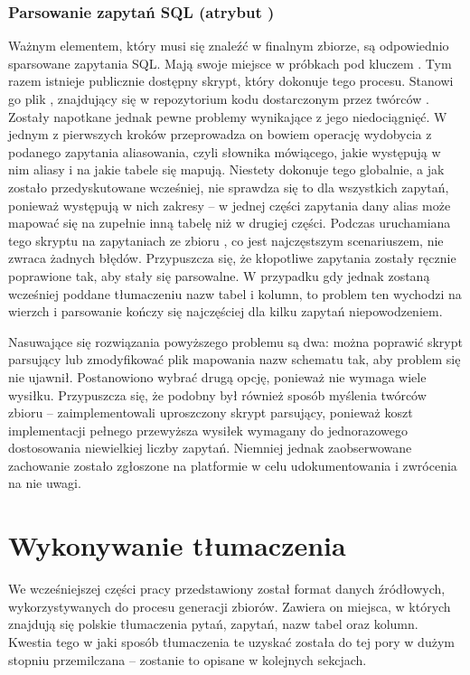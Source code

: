 \subsubsection{Parsowanie zapytań SQL (atrybut )}
Ważnym elementem, który musi się znaleźć w finalnym zbiorze, są odpowiednio sparsowane zapytania SQL. Mają swoje miejsce w próbkach pod kluczem . Tym razem istnieje publicznie dostępny skrypt, który dokonuje tego procesu. Stanowi go plik , znajdujący się w repozytorium kodu  dostarczonym przez twórców . Zostały napotkane jednak pewne problemy wynikające z jego niedociągnięć. W jednym z pierwszych kroków przeprowadza on bowiem operację wydobycia z podanego zapytania aliasowania, czyli słownika mówiącego, jakie występują w nim aliasy i na jakie tabele się mapują. Niestety dokonuje tego globalnie, a jak zostało przedyskutowane wcześniej, nie sprawdza się to dla wszystkich zapytań, ponieważ występują w nich zakresy -- w jednej części zapytania dany alias może mapować się na zupełnie inną tabelę niż w drugiej części. Podczas uruchamiana tego skryptu na zapytaniach ze zbioru , co jest najczęstszym scenariuszem, nie zwraca żadnych błędów. Przypuszcza się, że kłopotliwe zapytania zostały ręcznie poprawione tak, aby stały się parsowalne. W przypadku gdy jednak zostaną wcześniej poddane tłumaczeniu nazw tabel i kolumn, to problem ten wychodzi na wierzch i parsowanie kończy się najczęściej dla kilku zapytań niepowodzeniem. 

Nasuwające się rozwiązania powyższego problemu są dwa: można poprawić skrypt parsujący lub zmodyfikować plik mapowania nazw schematu tak, aby problem się nie ujawnił. Postanowiono wybrać drugą opcję, ponieważ nie wymaga wiele wysiłku. Przypuszcza się, że podobny był również sposób myślenia twórców zbioru  -- zaimplementowali uproszczony skrypt parsujący, ponieważ koszt implementacji pełnego przewyższa wysiłek wymagany do jednorazowego dostosowania niewielkiej liczby zapytań. Niemniej jednak zaobserwowane zachowanie zostało zgłoszone na platformie  w celu udokumentowania i zwrócenia na nie uwagi.

\section{Wykonywanie tłumaczenia}
We wcześniejszej części pracy przedstawiony został format danych źródłowych, wykorzystywanych do procesu generacji zbiorów. Zawiera on miejsca, w których znajdują się polskie tłumaczenia pytań, zapytań, nazw tabel oraz kolumn. Kwestia tego w jaki sposób tłumaczenia te uzyskać została do tej pory w dużym stopniu przemilczana -- zostanie to opisane w kolejnych sekcjach.

